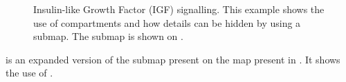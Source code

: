 \begin{figure}[htb]
\begin{center}
\caption{Insulin-like Growth Factor (IGF) signalling. This example shows the use of compartments and how details can be hidden by using a submap. The submap is shown on .}\label{fig:insulin}
\end{center}
\end{figure}

 is an expanded version of the submap present on the map present in . It shows the use of .

